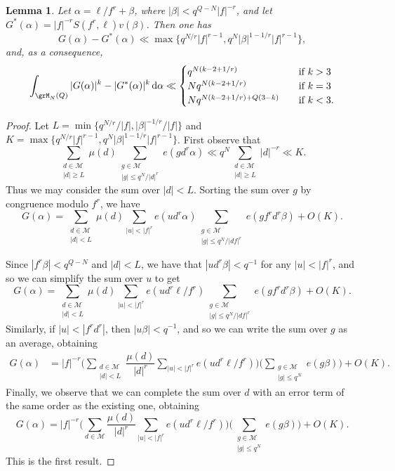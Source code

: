 \documentclass[reqno,11pt]{amsart}
\newtheorem{lemma}[theorem]{Lemma}
\theoremstyle{definition}
\theoremstyle{remark}
\numberwithin{equation}{section}
\def\calM{{\mathcal M}}
\renewcommand{\d}{\,{\rm d}} %
\newcommand{\<}{\begin{equation}}
\renewcommand{\>}{\end{equation}}
\begin{document}
\begin{lemma}\label{major-arcs}
    Let $\alpha = \ell/f^r + \beta$, where $|\beta| < q^{Q-N}|f|^{-r}$, and let $G^*(\alpha) = |f|^{-r}S(f^r,\ell)v(\beta)$. Then one has
    \[G(\alpha) - G^*(\alpha) \ll \max\{q^{N/r}|f|^{r-1},q^N|\beta|^{1-1/r}|f|^{r-1}\},\]
    and, as a consequence,
    \[\int_{\grM_N(Q)} |G(\alpha)|^k -  |G^*(\alpha)|^k \d\alpha \ll \begin{cases}
        q^{N(k-2+1/r)} \quad &\text{if } k>3 \\
        Nq^{N(k-2+1/r)} \quad &\text{if } k=3 \\
        Nq^{N(k-2+1/r) + Q(3-k)} \quad &\text{if } k < 3.
    \end{cases}\]
\end{lemma}
\begin{proof}
    Let $L = \min\{q^{N/r}/|f|,|\beta|^{-1/r}/|f|\}$ and $K = \max\{q^{N/r}|f|^{r-1},q^N|\beta|^{1-1/r}|f|^{r-1}\}$. First observe that
    \[\sum_{\substack{d \in \calM \\ |d| \geq L}} \mu(d) \sum_{\substack{g \in \calM \\ |g| \leq q^N/|d|^r}}e(gd^r\alpha) \ll q^N \sum_{\substack{d \in \calM \\ |d| \geq L}} |d|^{-r}  \ll K.\]
    Thus we may consider the sum over $|d|<L$. Sorting the sum over $g$ by congruence modulo $f^r$, we have
    \[G(\alpha) = \sum_{\substack{d \in \calM \\ |d| < L}} \mu(d) \sum_{|u| < |f|^r}e(ud^r\alpha)\sum_{\substack{g \in \calM \\ |g| \leq q^N/|df|^r}} e(gf^rd^r\beta) + O(K).\]
    
    Since $|f^r\beta|<q^{Q-N}$ and $|d| < L$, we have that $|ud^r\beta|<q^{-1}$ for any $|u|<|f|^r$, and so we can simplify the sum over $u$ to get
    \[G(\alpha) = \sum_{\substack{d \in \calM \\ |d| < L}} \mu(d) \sum_{|u| < |f|^r}e(ud^r\ell/f^r)\sum_{\substack{g \in \calM \\ |g| \leq q^N/|df|^r}} e(gf^rd^r\beta) + O(K).\]
    Similarly, if $|u|<|f^rd^r|$, then $|u\beta| < q^{-1}$, and so we can write the sum over $g$ as an average, obtaining
    \begin{align*}
        G(\alpha) &= |f|^{-r}\bigg(\sum_{\substack{d \in \calM \\ |d| < L}} \dfrac{\mu(d)}{|d|^r} \sum_{|u| < |f|^r}e(ud^r\ell/f^r)\bigg)\bigg(\sum_{\substack{g \in \calM \\ |g| \leq q^N}} e(g\beta) \bigg)+ O(K).
    \end{align*}
    Finally, we observe that we can complete the sum over $d$ with an error term of the same order as the existing one, obtaining
    \[G(\alpha) = |f|^{-r}\bigg(\sum_{d \in \calM} \dfrac{\mu(d)}{|d|^r} \sum_{|u| < |f|^r}e(ud^r\ell/f^r)\bigg)\bigg(\sum_{\substack{g \in \calM \\ |g| \leq q^N}} e(g\beta) \bigg)+ O(K).\]
    This is the first result.


\end{proof}
\end{document}
